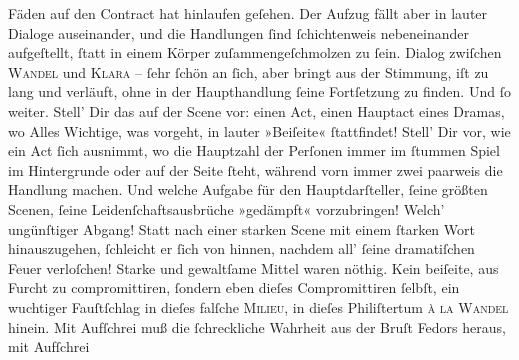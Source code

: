                Fäden auf den Contract hat hinlaufen geſehen. Der Aufzug fällt aber in lauter Dialoge auseinander, und die
               Handlungen{ }ſind{ }ſchichtenweis nebeneinander aufgeſtellt,{ }ſtatt in einem Körper
               zuſammengeſchmolzen zu{ }ſein. Dialog zwiſchen \textsc{Wandel} und \textsc{Klara} –{ }ſehr{ }ſchön an{ }ſich, aber bringt aus der Stimmung, iſt zu lang und verläuft,
               ohne in der Haupthandlung{ }ſeine Fortſetzung zu finden. Und{ }ſo weiter. Stell’ Dir das
               auf der Scene vor: einen Act, einen Hauptact eines Dramas, wo Alles Wichtige, was
               vorgeht, in lauter »Beiſeite«{ }ſtattfindet! Stell’ Dir vor, wie ein Act{ }ſich ausnimmt,
               wo  die Haupt\strikeout{\textcolor{gray}{h}}zahl der Perſonen immer im{ }ſtummen Spiel im Hintergrunde oder auf der Seite{ }ſteht, während vorn immer zwei paarweis {\pb}die
               Handlung machen. Und welche Aufgabe für den Hauptdarſteller,{ }ſeine größten Scenen,{ }ſeine Leidenſchaftsausbrüche »gedämpft« vorzubringen! Welch’ ungünſtiger Abgang!
               Statt nach einer starken Scene mit einem{ }ſtarken Wort hinauszugehen,{ }ſchleicht er{ }ſich von hinnen, nachdem all’{ }ſeine dramatiſchen Feuer verloſchen! Starke und
               gewaltſame Mittel waren nöthig. Kein beiſeite, aus Furcht zu compromittiren,{ }ſondern
               eben dieſes Compromittiren{ }ſelbſt, ein wuchtiger Fauſtſchlag \strikeout{\textcolor{gray}{×}\-\textcolor{gray}{×}\-\textcolor{gray}{×}} in dieſes falſche \textsc{Milieu}, in dieſes Philiſtertum \textsc{à la Wandel} hinein. Mit Aufſchrei muß die{ }ſchreckliche Wahrheit aus der Bruſt Fedors heraus, mit Aufſchrei
